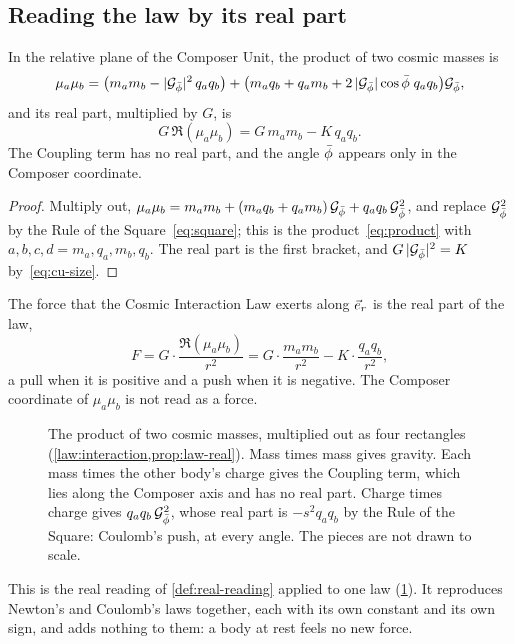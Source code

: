 \subsection{Reading the law by its real part}\label{subsec:reading-law}

\begin{proposition}\label{prop:law-real}
In the relative plane of the Composer Unit, the product of two cosmic masses is
\[
\mu_a\mu_b = \bigl(m_a m_b - \lvert\mathcal{G}_{\bar{\phi}}\rvert^2\,q_a q_b\bigr) + \bigl(m_a q_b + q_a m_b + 2\,\lvert\mathcal{G}_{\bar{\phi}}\rvert\cos\bar{\phi}\;q_a q_b\bigr)\mathcal{G}_{\bar{\phi}} ,
\]
and its real part, multiplied by $G$, is
\[
G\,\Re(\mu_a\mu_b) = G\,m_a m_b - K\,q_a q_b .
\]
The Coupling term has no real part, and the angle $\bar{\phi}$ appears only in the Composer coordinate.
\end{proposition}

\begin{proof}
Multiply out, $\mu_a\mu_b = m_a m_b + (m_a q_b + q_a m_b)\,\mathcal{G}_{\bar{\phi}} + q_a q_b\,\mathcal{G}_{\bar{\phi}}^2$, and replace $\mathcal{G}_{\bar{\phi}}^2$ by the Rule of the Square~\cref{eq:square}; this is the product~\cref{eq:product} with $a, b, c, d = m_a, q_a, m_b, q_b$. The real part is the first bracket, and $G\,\lvert\mathcal{G}_{\bar{\phi}}\rvert^2 = K$ by~\cref{eq:cu-size}.
\end{proof}

\begin{definition}\label{def:reading}
The force that the Cosmic Interaction Law exerts along $\vec{e}_{r}$ is the real part of the law,
\[
F = G\cdot\frac{\Re(\mu_a\mu_b)}{r^2} = G\cdot\frac{m_a m_b}{r^2} - K\cdot\frac{q_a q_b}{r^2} ,
\]
a pull when it is positive and a push when it is negative. The Composer coordinate of $\mu_a\mu_b$ is not read as a force.
\end{definition}

\begin{figure}[t]
\centering

\caption{The product of two cosmic masses, multiplied out as four rectangles (\cref{law:interaction,prop:law-real}). Mass times mass gives gravity. Each mass times the other body's charge gives the Coupling term, which lies along the Composer axis and has no real part. Charge times charge gives $q_a q_b\,\mathcal{G}_{\bar{\phi}}^2$, whose real part is $-s^2 q_a q_b$ by the Rule of the Square: Coulomb's push, at every angle. The pieces are not drawn to scale.}
\label{fig:product}
\end{figure}

This is the real reading of \cref{def:real-reading} applied to one law (\cref{fig:product}). It reproduces Newton's and Coulomb's laws together, each with its own constant and its own sign, and adds nothing to them: a body at rest feels no new force.

